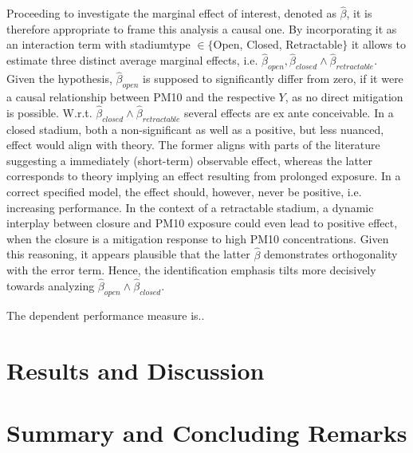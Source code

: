 \documentclass[12pt,a4paper]{article}
\begin{document}
{Proceeding to investigate the marginal effect of interest, denoted as $\hat{\beta}$, it is therefore appropriate to frame this analysis a causal one. By incorporating it as an interaction term with stadiumtype $\in \{$Open, Closed, Retractable$\}$ it allows to estimate three distinct average marginal effects, i.e. $\hat{\beta}_{open},\hat{\beta}_{closed} \wedge \hat{\beta}_{retractable}$. Given the hypothesis, $\hat{\beta}_{open}$ is supposed to significantly differ from zero, if it were a causal relationship between PM10 and the respective $Y$, as no direct mitigation is possible. W.r.t. $\hat{\beta}_{closed} \wedge \hat{\beta}_{retractable}$ several effects are ex ante conceivable. In a closed stadium, both a non-significant as well as a positive, but less nuanced, effect would align with theory. The former aligns with parts of the literature suggesting a immediately (short-term)  observable effect, whereas the latter corresponds to theory implying an effect resulting from prolonged exposure. In a correct specified model, the effect should, however, never be positive, i.e. increasing performance. In the context of a retractable stadium, a dynamic interplay between closure and PM10 exposure could even lead to positive effect, when the closure is a mitigation response to high PM10 concentrations. Given this reasoning, it appears plausible that the latter $\hat{\beta}$ demonstrates orthogonality with the error term. Hence, the identification emphasis tilts more decisively towards analyzing $\hat{\beta}_{open} \wedge \hat{\beta}_{closed}$.

The dependent performance measure is..

\section{Results and Discussion}
\clearpage
\section{Summary and Concluding Remarks}
\clearpage


\setcounter{page}{\thesavepage}
\pagestyle{plain}


\clearpage

}
\end{document}
